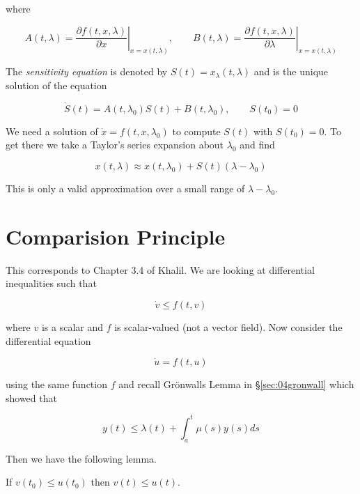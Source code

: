 where

\begin{equation*}
A(t,\lambda) = \left.\frac{\partial f(t,x,\lambda)}{\partial x}\right|_{x=x(t,\lambda)}, \qquad B(t,\lambda) = \left.\frac{\partial f(t,x,\lambda)}{\partial\lambda}\right|_{x=x(t,\lambda)}
\end{equation*}


The \textit{sensitivity equation} is denoted by $S(t) = x_\lambda(t,\lambda)$ and is the unique solution of the equation

\begin{equation*}
\dot{S}(t) = A(t,\lambda_0)S(t) + B(t,\lambda_0), \qquad S(t_0) = 0
\end{equation*}

We need a solution of $\dot{x}=f(t,x,\lambda_0)$ to compute $S(t)$ with $S(t_0)=0$.
To get there we take a Taylor's series expansion about $\lambda_0$ and find

\begin{equation*}
x(t,\lambda) \approx x(t,\lambda_0) + S(t)(\lambda-\lambda_0)
\end{equation*}

This is only a valid approximation over a small range of $\lambda-\lambda_0$.

\section{Comparision Principle}
This corresponds to Chapter 3.4 of Khalil.
We are looking at differential inequalities such that

\begin{equation*}
\dot{v}\leq f(t,v)
\end{equation*}

where $v$ is a scalar and $f$ is scalar-valued (not a vector field).
Now consider the differential equation

\begin{equation*}
\dot{u} = f(t,u)
\end{equation*}

using the same function $f$ and recall Gr\"onwalls Lemma in \S\ref{sec:04gronwall} which showed that

\begin{equation*}
y(t) \leq \lambda(t) + \int_a^t\mu(s)y(s)ds
\end{equation*}

Then we have the following lemma.

\begin{lemma}
If $v(t_0)\leq u(t_0)$ then $v(t)\leq u(t)$.
\end{lemma}

